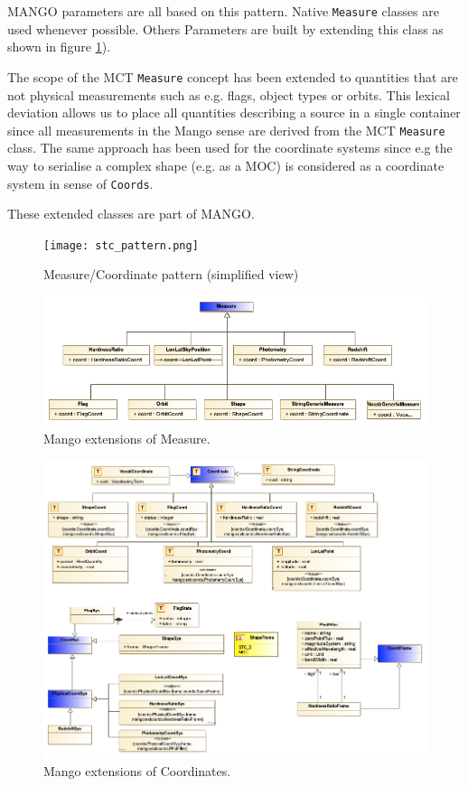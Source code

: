 \documentclass[11pt,a4paper]{ivoa}
\begin{document}
MANGO parameters are all based on this pattern.
Native  \texttt{Measure} classes are used whenever possible.
Others Parameters are built by extending this class as shown in figure \ref{fig:stcpattern}).

The scope of the MCT \texttt{Measure}  concept has been extended to quantities that are not physical measurements such as e.g. flags, object types or orbits.
This lexical deviation allows us to place all quantities describing a source in a single container since all measurements in the Mango sense are derived from the MCT \texttt{Measure} class.
The same approach has been used for the coordinate systems since e.g the way to serialise a complex shape (e.g. as a MOC) is considered as a coordinate system in sense of \texttt{Coords}.

These extended classes are part of MANGO.
\begin{figure}
     \texttt{[image: stc\_pattern.png]}
     \caption{Measure/Coordinate pattern (simplified view)}
     \label{fig:stcpattern}
\end{figure}

\begin{figure}
  \includegraphics[width=1.0\textwidth]{../model/mangoMeasures.png}
  \caption{Mango extensions of Measure.}
  \label{fig:measures}
\end{figure}

\begin{figure}
  \includegraphics[width=1.0\textwidth]{../model/mangoCoordinates.png}
  \caption{Mango extensions of Coordinates.}
  \label{fig:coordinates}
\end{figure}
\end{document}
